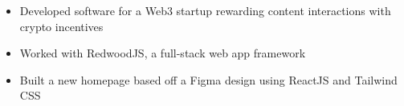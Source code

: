 {
	\begin{itemize}
		\item Developed software for a Web3 startup rewarding content interactions with crypto incentives
		\item Worked with RedwoodJS, a full-stack web app framework
		\item Built a new homepage based off a Figma design using ReactJS and Tailwind CSS
	\end{itemize}
}